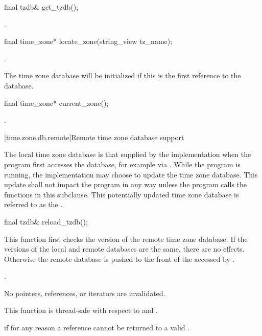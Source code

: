 %
\begin{itemdecl}
final tzdb& get_tzdb();
\end{itemdecl}

\begin{itemdescr}
\pnum
\returns {}.
\end{itemdescr}

%
\begin{itemdecl}
final time_zone* locate_zone(string_view tz_name);
\end{itemdecl}

\begin{itemdescr}
\pnum
\returns {}.

\pnum
\begin{note}
The time zone database will be initialized
if this is the first reference to the database.
\end{note}
\end{itemdescr}

%
\begin{itemdecl}
final time_zone* current_zone();
\end{itemdecl}

\begin{itemdescr}
\pnum
\returns {}.
\end{itemdescr}

[time.zone.db.remote]{Remote time zone database support}

\pnum
The local time zone database
is that supplied by the implementation
when the program first accesses the database,
for example via .
While the program is running,
the implementation may choose to update the time zone database.
This update shall not impact the program in any way
unless the program calls the functions in this subclause.
This potentially updated time zone database
is referred to as the .

%
\begin{itemdecl}
final tzdb& reload_tzdb();
\end{itemdecl}

\begin{itemdescr}
\pnum
\effects
This function first checks
the version of the remote time zone database.
If the versions of the local and remote databases are the same,
there are no effects.
Otherwise the remote database is pushed
to the front of the 
accessed by .

\pnum
\returns {}.

\pnum
\remarks
No pointers, references, or iterators are invalidated.

\pnum
\remarks
This function is thread-safe with respect to
 and .

\pnum
\throws
{} if for any reason
a reference cannot be returned to a valid .
\end{itemdescr}

